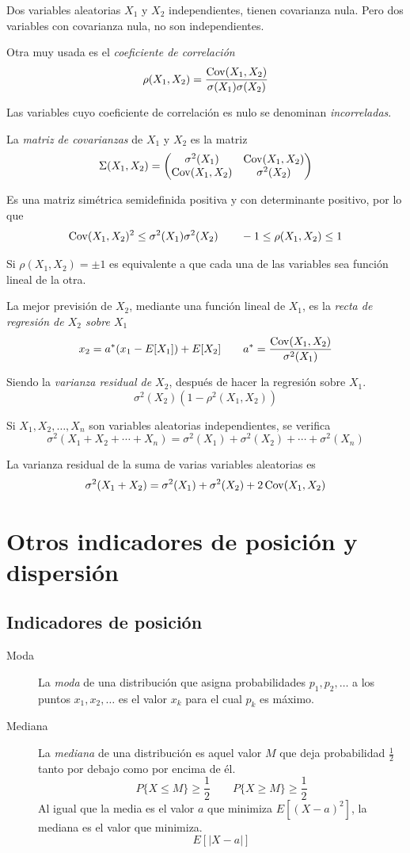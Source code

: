 Dos variables aleatorias $X_1$ y $X_2$ independientes, tienen covarianza nula. Pero dos variables con covarianza nula, no son independientes.

Otra muy usada es el \emph{coeficiente de correlación}
\[
\rho(X_1,X_2) = \frac{\operatorname{Cov}(X_1,X_2)}{\sigma(X_1)\sigma(X_2)}
\]

Las variables cuyo coeficiente de correlación es nulo se denominan \emph{incorreladas}.

La \emph{matriz de covarianzas} de $X_1$ y $X_2$ es la matriz
\[
\Sigma(X_1,X_2) = \begin{pmatrix}
    \sigma^2(X_1) & \operatorname{Cov}(X_1,X_2) \\
    \operatorname{Cov}(X_1,X_2) & \sigma^2(X_2)
\end{pmatrix}
\]

Es una matriz simétrica semidefinida positiva y con determinante positivo, por lo que
\[
\operatorname{Cov}(X_1,X_2)^2 \leq \sigma^2(X_1)\sigma^2(X_2) \qquad -1 \leq \rho(X_1,X_2) \leq 1
\]

Si $\rho(X_1,X_2) = \pm 1$ es equivalente a que cada una de las variables sea función lineal de la otra.

La mejor previsión de $X_2$, mediante una función lineal de $X_1$, es la \emph{recta de regresión de $X_2$ sobre $X_1$}
\[
x_2 = a^*(x_1 - E[X_1]) + E[X_2] \qquad a^* = \frac{\operatorname{Cov}(X_1,X_2)}{\sigma^2(X_1)}
\]

Siendo la \emph{varianza residual de $X_2$}, después de hacer la regresión sobre $X_1$.
\[
\sigma^2(X_2)(1 - \rho^2(X_1,X_2))
\]

Si $X_1,X_2,\ldots,X_n$ son variables aleatorias independientes, se verifica
\[
\sigma^2(X_1 + X_2 + \cdots + X_n) = \sigma^2(X_1) + \sigma^2(X_2) + \cdots + \sigma^2(X_n)
\]

La varianza residual de la suma de varias variables aleatorias es
\[
\sigma^2(X_1 + X_2) = \sigma^2(X_1) + \sigma^2(X_2) + 2\operatorname{Cov}(X_1,X_2)
\]

\section{Otros indicadores de posición y dispersión}

\subsection{Indicadores de posición}

\begin{description}
    \item[Moda] La \emph{moda} de una distribución que asigna probabilidades $p_1,p_2,\ldots$ a los puntos $x_1,x_2,\ldots$ es el valor $x_k$ para el cual $p_k$ es máximo.
    \item[Mediana]  La \emph{mediana} de una distribución es aquel valor $M$ que deja probabilidad $\frac{1}{2}$ tanto por debajo como por encima de él.
    \[P\{X \leq M\} \geq \frac{1}{2} \qquad P\{X \geq M\} \geq \frac{1}{2}\]
    Al igual que la media es el valor $a$ que minimiza $E[(X-a)^2]$, la mediana es el valor que minimiza.
    \[
    E[|X-a|]
    \]
\end{description}

